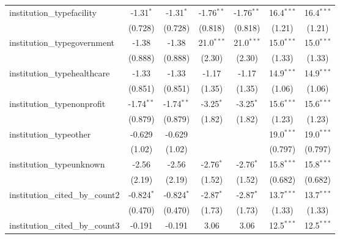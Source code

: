 \begin{tabular}{lcccccc}
   institution\_typefacility             & -1.31$^{*}$   & -1.31$^{*}$   & -1.76$^{**}$  & -1.76$^{**}$  & 16.4$^{***}$  & 16.4$^{***}$\\   
                                         & (0.728)       & (0.728)       & (0.818)       & (0.818)       & (1.21)        & (1.21)\\   
   institution\_typegovernment           & -1.38         & -1.38         & 21.0$^{***}$  & 21.0$^{***}$  & 15.0$^{***}$  & 15.0$^{***}$\\   
                                         & (0.888)       & (0.888)       & (2.30)        & (2.30)        & (1.33)        & (1.33)\\   
   institution\_typehealthcare           & -1.33         & -1.33         & -1.17         & -1.17         & 14.9$^{***}$  & 14.9$^{***}$\\   
                                         & (0.851)       & (0.851)       & (1.35)        & (1.35)        & (1.06)        & (1.06)\\   
   institution\_typenonprofit            & -1.74$^{**}$  & -1.74$^{**}$  & -3.25$^{*}$   & -3.25$^{*}$   & 15.6$^{***}$  & 15.6$^{***}$\\   
                                         & (0.879)       & (0.879)       & (1.82)        & (1.82)        & (1.23)        & (1.23)\\   
   institution\_typeother                & -0.629        & -0.629        &               &               & 19.0$^{***}$  & 19.0$^{***}$\\   
                                         & (1.02)        & (1.02)        &               &               & (0.797)       & (0.797)\\   
   institution\_typeunknown              & -2.56         & -2.56         & -2.76$^{*}$   & -2.76$^{*}$   & 15.8$^{***}$  & 15.8$^{***}$\\   
                                         & (2.19)        & (2.19)        & (1.52)        & (1.52)        & (0.682)       & (0.682)\\   
   institution\_cited\_by\_count2        & -0.824$^{*}$  & -0.824$^{*}$  & -2.87$^{*}$   & -2.87$^{*}$   & 13.7$^{***}$  & 13.7$^{***}$\\   
                                         & (0.470)       & (0.470)       & (1.73)        & (1.73)        & (1.33)        & (1.33)\\   
   institution\_cited\_by\_count3        & -0.191        & -0.191        & 3.06          & 3.06          & 12.5$^{***}$  & 12.5$^{***}$\\   

\end{tabular}
